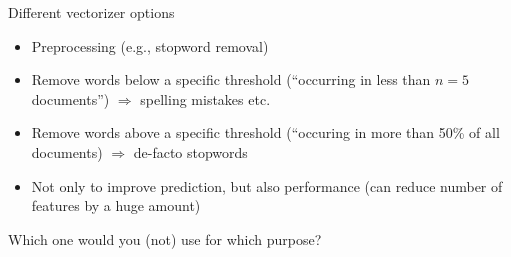 \documentclass[compress]{beamer}
\begin{document}
\begin{frame}{Different vectorizer options}
\begin{itemize}
	\item Preprocessing (e.g., stopword removal)
	\item Remove words below a specific threshold (``occurring in less than $n=5$ documents'') $\Rightarrow$ spelling mistakes etc.
	\item Remove words above a specific threshold (``occuring in more than 50\% of all documents) $\Rightarrow$ de-facto stopwords
	\item Not only to improve prediction, but also performance (can reduce number of features by a huge amount)
\end{itemize}
\end{frame}








\begin{frame}{Which one would you (not) use for which purpose?}

\end{frame}
\end{document}
